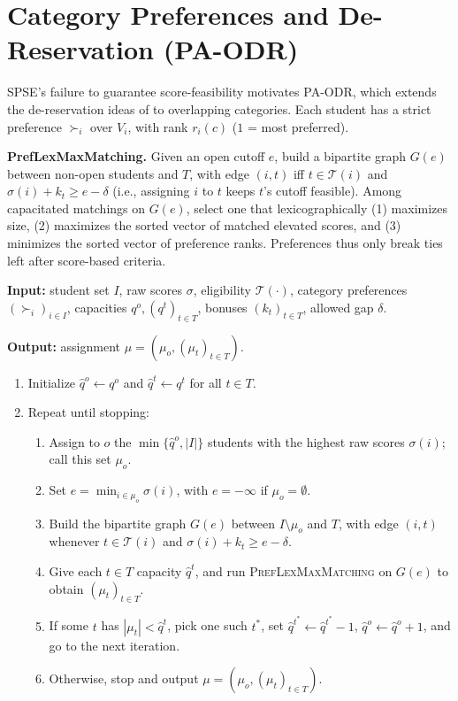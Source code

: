 \documentclass[10pt]{article}
\newcommand{\T}{\mathcal{T}}
\newcommand{\1}{\mathbf{1}}
\newcommand{\yao}[1]{{\color{blue}#1}}
\begin{document}
\section{Category Preferences and De-Reservation (PA-ODR)}

SPSE's failure to guarantee score-feasibility motivates \textsc{PA-ODR}, which extends the de-reservation ideas of \citet{AyTu20a,AyTu23a} to overlapping categories. Each student has a strict preference $\succ_i$ over $V_i$, with rank $r_i(c)$ ($1$ = most preferred).

\textbf{PrefLexMaxMatching.} Given an open cutoff $e$, build a bipartite graph $G(e)$ between non-open students and $T$, with edge $(i,t)$ iff $t\in\T(i)$ and $\sigma(i)+k_t\ge e-\delta$ (i.e., assigning $i$ to $t$ keeps $t$'s cutoff feasible). Among capacitated matchings on $G(e)$, select one that lexicographically (1) maximizes size, (2) maximizes the sorted vector of matched elevated scores, and (3) minimizes the sorted vector of preference ranks. Preferences thus only break ties left after score-based criteria.

\begin{algorithm}[H]
\caption{Preference-Aware Overlapping De-Reservation (PA-ODR)}
\label{alg:pa-odr}
\small
\textbf{Input:} student set $I$, raw scores $\sigma$, eligibility $\T(\cdot)$, category preferences $(\succ_i)_{i\in I}$, capacities $q^o,(q^t)_{t\in T}$, bonuses $(k_t)_{t\in T}$, allowed gap $\delta$.

\textbf{Output:} assignment $\mu=(\mu_o,(\mu_t)_{t\in T})$.
\begin{enumerate}
\item Initialize $\hat q^o\leftarrow q^o$ and $\hat q^t\leftarrow q^t$ for all $t\in T$.
\item Repeat until stopping:
\begin{enumerate}
\item Assign to $o$ the $\min\{\hat q^o,|I|\}$ students with the highest raw scores $\sigma(i)$; call this set $\mu_o$.
\item Set $e=\min_{i\in\mu_o}\sigma(i)$, with $e=-\infty$ if $\mu_o=\emptyset$. 
\item Build the bipartite graph $G(e)$ between $I\setminus\mu_o$ and $T$, with edge $(i,t)$ whenever $t\in\T(i)$ and $\sigma(i)+k_t\ge e-\delta$.
\item Give each $t\in T$ capacity $\hat q^t$, and run \textsc{PrefLexMaxMatching} on $G(e)$ to obtain $(\mu_t)_{t\in T}$.
\item If some $t$ has $|\mu_t|<\hat q^t$, pick one such $t^\ast$, set $\hat q^{t^\ast}\leftarrow\hat q^{t^\ast}-1$, $\hat q^o\leftarrow\hat q^o+1$, and go to the next iteration.
\item Otherwise, stop and output $\mu=(\mu_o,(\mu_t)_{t\in T})$.
\end{enumerate}
\end{enumerate}
\end{algorithm}
\end{document}
